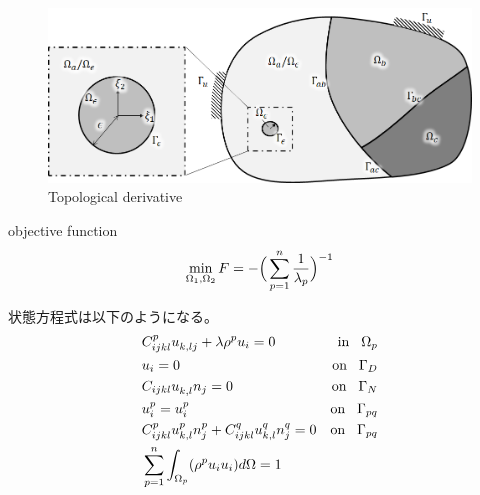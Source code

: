 \begin{figure}[ht]
	\begin{center}
		\includegraphics[width=13cm]{./figures/TD.png}
		\caption{Topological derivative}
		\label{fig:TD}
	\end{center}
\end{figure}

objective function
\begin{align}
\min_{\Omega_1,\Omega_2}F=-\Bigr(\sum_{p=1}^{n}\frac{1}{\lambda_p}\Bigl)^{-1}
\end{align}


状態方程式は以下のようになる。
\begin{align}
	&C_{ijkl}^{p}u_{k,lj}^{}+\lambda\rho^{p} u_{i}=0&\text{in}\hspace{0.3cm}\Omega_{p}
	\label{eq:govmain}
	\\
	&u_{i}=0 &\text{on}\hspace{0.3cm}\Gamma_{D}
	\\
	&C_{ijkl}u_{k,l}^{}n_{j}=0 &\text{on}\hspace{0.3cm}\Gamma_{N}
	\\
	&u_{i}^{p}=u_{i}^{p} &\text{on}\hspace{0.3cm}\Gamma_{pq}
	\\
	&C_{ijkl}^{p}u_{k,l}^{p}n_{j}^{p}+C_{ijkl}^{q}u_{k,l}^{q}n_{j}^{q}=0 &\text{on}\hspace{0.3cm}\Gamma_{pq}
	\label{eq:govbc}
	\\
	&\sum_{p=1}^{n}\int_{\Omega_p}(\rho^{p}u_{i}u_{i}) d\Omega=1
	\label{eq:govnorm}
\end{align}


